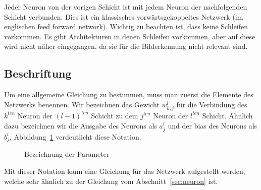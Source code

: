 \documentclass[12pt,a4paper]{report}
\begin{document}
Jeder Neuron von der vorigen Schicht ist mit jedem Neuron der nachfolgenden Schicht verbunden.
Dies ist ein klassisches vorwärtsgekoppeltes Netzwerk (im englischen feed forward network).
Wichtig zu beachten ist, dass keine Schleifen vorkommen.
Es gibt Architekturen in denen Schleifen vorkommen, aber auf diese wird nicht näher eingegangen, da sie für die
Bilderkennung nicht relevant sind.

\subsection{Beschriftung}

Um eine allgemeine Gleichung zu bestimmen, muss man zuerst die Elemente des Netzwerks benennen.
Wir bezeichnen das Gewicht $w^l_{k,j}$ für die Verbindung des $k^{ten}$ Neuron der $(l-1)^{ten}$ Schicht
zu dem $j^{ten}$ Neuron der $l^{ten}$ Schicht.
Ähnlich dazu bezeichnen wir die Ausgabe des Neurons als $a^l_j$ und der bias des Neurons als $b^l_j$,
Abbildung~\ref{fig:network3} verdeutlicht diese Notation.

\begin{figure}[h]
    \centering
{}
    \caption{Bezeichnung der Parameter}
    \label{fig:network3}
\end{figure}
Mit dieser Notation kann eine Gleichung für das Netzwerk aufgestellt werden, welche sehr ähnlich zu der Gleichung vom Abschnitt~\ref{sec:neuron} ist.
\end{document}
